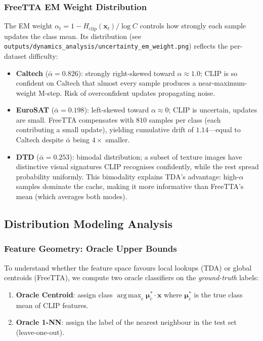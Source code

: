 \documentclass[12pt,a4paper]{article}
\DeclareMathOperator*{\argmax}{arg\,max}
\newcommand{\bx}{\mathbf{x}}
\newcommand{\bmu}{\boldsymbol{\mu}}
\newcommand{\1}{\mathbf{1}}
\begin{document}
\subsubsection{FreeTTA EM Weight Distribution}

The EM weight $\alpha_t = 1 - H_\text{clip}(\bx_t)/\log C$ controls how strongly each sample
updates the class mean.
Its distribution (see \texttt{outputs/dynamics\_analysis/uncertainty\_em\_weight.png})
reflects the per-dataset difficulty:

\begin{itemize}
  \item \textbf{Caltech} ($\bar{\alpha}=0.826$): strongly right-skewed toward $\alpha \approx 1.0$;
  CLIP is so confident on Caltech that almost every sample produces a near-maximum-weight M-step.
  Risk of overconfident updates propagating noise.

  \item \textbf{EuroSAT} ($\bar{\alpha}=0.198$): left-skewed toward $\alpha \approx 0$;
  CLIP is uncertain, updates are small.
  FreeTTA compensates with $810$ samples per class (each contributing a small update), yielding
  cumulative drift of $1.14$---equal to Caltech despite $\bar{\alpha}$ being $4\times$ smaller.

  \item \textbf{DTD} ($\bar{\alpha}=0.253$): bimodal distribution; a subset of texture images have
  distinctive visual signatures CLIP recognises confidently, while the rest spread probability
  uniformly. This bimodality explains TDA's advantage: high-$\alpha$ samples dominate the cache,
  making it more informative than FreeTTA's mean (which averages both modes).
\end{itemize}

\subsection{Distribution Modeling Analysis}

\subsubsection{Feature Geometry: Oracle Upper Bounds}

To understand whether the feature space favours local lookups (TDA) or global centroids (FreeTTA),
we compute two oracle classifiers on the \emph{ground-truth} labels:
\begin{enumerate}
  \item \textbf{Oracle Centroid}: assign class $\argmax_c \bmu_c^\ast \cdot \bx$ where
  $\bmu_c^\ast$ is the true class mean of CLIP features.
  \item \textbf{Oracle 1-NN}: assign the label of the nearest neighbour in the test set
  (leave-one-out).
\end{enumerate}
\end{document}
